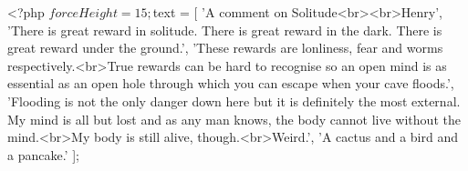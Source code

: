 <?php
$forceHeight = 15;
$text = [
	'A comment on Solitude<br><br>Henry',
	'There is great reward in solitude. There is great reward in the dark. There is great reward under the ground.',
	'These rewards are lonliness, fear and worms respectively.<br>True rewards can be hard to recognise so an open mind is as essential as an open hole through which you can escape when your cave floods.',
	'Flooding is not the only danger down here but it is definitely the most external. My mind is all but lost and as any man knows, the body cannot live without the mind.<br>My body is still alive, though.<br>Weird.',
	'A cactus and a bird and a pancake.'
];